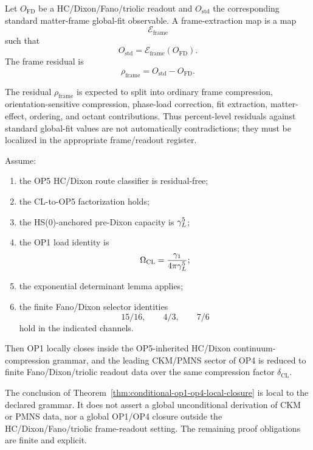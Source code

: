 \begin{definition}
\label{def:frame-extraction-residual}
Let \(O_{\mathrm{FD}}\) be a HC/Dixon/Fano/triolic readout and
\(O_{\mathrm{std}}\) the corresponding standard matter-frame
global-fit observable.  A frame-extraction map is a map
\[
  \mathcal E_{\mathrm{frame}}
\]
such that
\[
  O_{\mathrm{std}}
  =
  \mathcal E_{\mathrm{frame}}(O_{\mathrm{FD}}).
\]
The frame residual is
\[
  \rho_{\mathrm{frame}}
  =
  O_{\mathrm{std}}-O_{\mathrm{FD}}.
\]
\end{definition}

\begin{remark}
\label{rem:frame-sensitive-residuals}
The residual \(\rho_{\mathrm{frame}}\) is expected to split into
ordinary frame compression, orientation-sensitive compression,
phase-load correction, fit extraction, matter-effect, ordering, and
octant contributions.  Thus percent-level residuals against standard
global-fit values are not automatically contradictions; they must be
localized in the appropriate frame/readout register.
\end{remark}

\begin{theorem}
\label{thm:conditional-op1-op4-local-closure}
Assume:
\begin{enumerate}
  \item the OP5 HC/Dixon route classifier is residual-free;
  \item the CL-to-OP5 factorization holds;
  \item the HS(0)-anchored pre-Dixon capacity is \(\gamma_L^5\);
  \item the OP1 load identity is
  \[
    \Omega_{\mathrm{CL}}
    =
    \frac{\gamma_1}{4\pi\gamma_L^5};
  \]
  \item the exponential determinant lemma applies;
  \item the finite Fano/Dixon selector identities
  \[
    15/16,
    \qquad
    4/3,
    \qquad
    7/6
  \]
  hold in the indicated channels.
\end{enumerate}
Then OP1 locally closes inside the OP5-inherited HC/Dixon
continuum-compression grammar, and the leading CKM/PMNS sector of OP4
is reduced to finite Fano/Dixon/triolic readout data over the same
compression factor \(\delta_{\mathrm{CL}}\).
\end{theorem}

\begin{remark}
\label{rem:op1-op4-nonglobal-status}
The conclusion of Theorem~\ref{thm:conditional-op1-op4-local-closure}
is local to the declared grammar.  It does not assert a global
unconditional derivation of CKM or PMNS data, nor a global OP1/OP4
closure outside the HC/Dixon/Fano/triolic frame-readout setting.
The remaining proof obligations are finite and explicit.
\end{remark}

